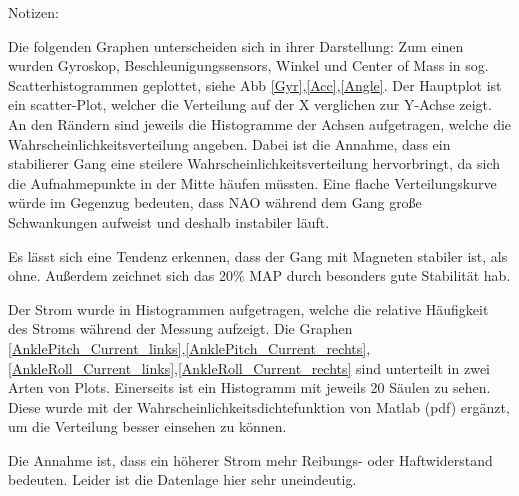 Notizen:

Die folgenden Graphen unterscheiden sich in ihrer Darstellung: Zum einen wurden Gyroskop, Beschleunigungssensors, Winkel und Center of Mass in sog. Scatterhistogrammen geplottet, siehe Abb \ref{Gyr},\ref{Acc},\ref{Angle}. Der Hauptplot ist ein scatter-Plot, welcher die Verteilung auf der X verglichen zur Y-Achse zeigt. An den Rändern sind jeweils die Histogramme der Achsen aufgetragen, welche die Wahrscheinlichkeitsverteilung angeben. Dabei ist die Annahme, dass ein stabilierer Gang eine steilere Wahrscheinlichkeitsverteilung hervorbringt, da sich die Aufnahmepunkte in der Mitte häufen müssten. Eine flache Verteilungskurve würde im Gegenzug bedeuten, dass NAO während dem Gang große Schwankungen aufweist und deshalb instabiler läuft.

Es lässt sich eine Tendenz erkennen, dass der Gang mit Magneten stabiler ist, als ohne. Außerdem zeichnet sich das 20\% MAP durch besonders gute Stabilität hab. 

Der Strom wurde in Histogrammen aufgetragen, welche die relative Häufigkeit des Stroms während der Messung aufzeigt. Die Graphen \ref{AnklePitch_Current_links},\ref{AnklePitch_Current_rechts},\ref{AnkleRoll_Current_links},\ref{AnkleRoll_Current_rechts} sind unterteilt in zwei Arten von Plots. Einerseits ist ein Histogramm mit jeweils 20 Säulen zu sehen. Diese wurde mit der Wahrscheinlichkeitsdichtefunktion von Matlab (pdf) ergänzt, um die Verteilung besser einsehen zu können.

Die Annahme ist, dass ein höherer Strom mehr Reibungs- oder Haftwiderstand bedeuten. Leider ist die Datenlage hier sehr uneindeutig. 

